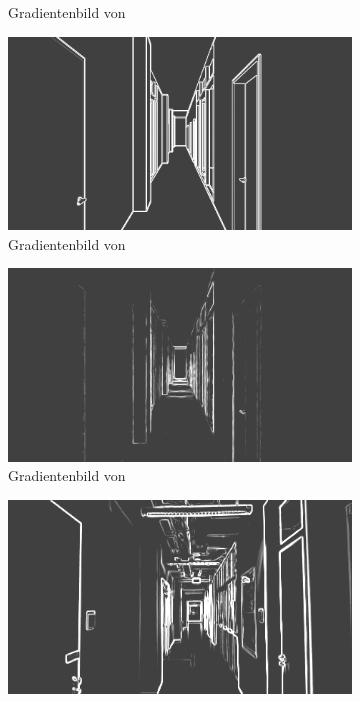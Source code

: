 \begin{figure}[H]
\begin{subfigure}[t]{0.24\linewidth}
		\caption{Gradientenbild  \hspace{1cm} von }
	\end{subfigure}
	\hfill
	\begin{subfigure}[t]{0.24\linewidth}
		\centering
		\includegraphics[width=\linewidth]{images/syn_dataset/eg00708.png}
		\caption{Gradientenbild  \hspace{1cm} von }
	\end{subfigure}
	\hfill
	\begin{subfigure}[t]{0.24\linewidth}
		\centering
		\includegraphics[width=\linewidth]{images/syn_dataset/cg00708.png}
		\caption{Gradientenbild  \hspace{1cm} von }
	\end{subfigure}
	\begin{subfigure}[t]{0.24\linewidth}
		\centering
		\includegraphics[width=\linewidth]{images/syn_dataset/rg000305.png}

\end{subfigure}
\end{figure}
